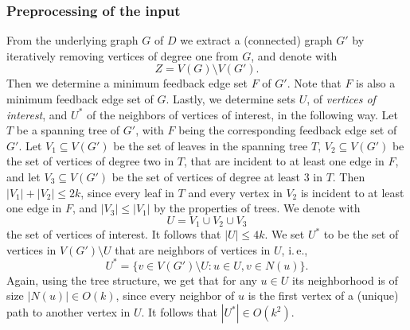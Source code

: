 \documentclass[a4paper,UKenglish,cleveref, autoref, thm-restate]{lipics-v2021}
\newcommand{\ie}{i.\,e.,\ }
\begin{document}
\subsubsection{Preprocessing of the input \label{sec:preprocessing-FPT}}
From the underlying graph $G$ of $D$ we extract a (connected) graph $G'$ by
iteratively removing vertices of degree one from $G$,
and denote with 
\[
Z = V(G) \setminus V(G').
\]
Then we determine a minimum feedback edge set $F$ of $G'$.
Note that $F$ is also a minimum feedback edge set of $G$.
Lastly, we determine sets $U$, of \emph{vertices of interest}, and $U^*$ of the neighbors of vertices of interest, in the following way.
Let $T$ be a spanning tree of $G'$, with $F$ being the corresponding feedback edge set of $G'$.
Let $V_1 \subseteq V(G')$ be the set of leaves in the spanning tree $T$, $V_2 \subseteq V(G')$ be the set of vertices of degree two in $T$, that are incident to at least one edge in $F$, 
and let $V_3 \subseteq V(G')$ be the set of vertices of degree at least $3$ in $T$. 
Then $|V_1| + |V_2| \leq 2k$, since every leaf in $T$ and every vertex in $V_2$ is incident to at least one edge in $F$,
and $|V_3| \leq |V_1|$ by the properties of trees.
We denote with 
\[U = V_1 \cup V_2 \cup V_3\]
the set of vertices of interest. It follows that $|U| \leq 4k$.
We set $U^*$ to be the set of vertices in $V(G') \setminus U$ that are neighbors of vertices in $U$, \ie 
\[U^* = \{v \in V(G') \setminus U  :  u \in U, v \in N(u)\}.\]
Again, using the tree structure, we get that for any $u \in U$ its neighborhood is of size $|N(u)| \in O(k)$, since every neighbor of $u$ is the first vertex of a (unique) path to another vertex in $U$.
It follows that $|U^*| \in O(k^2)$.
\end{document}
